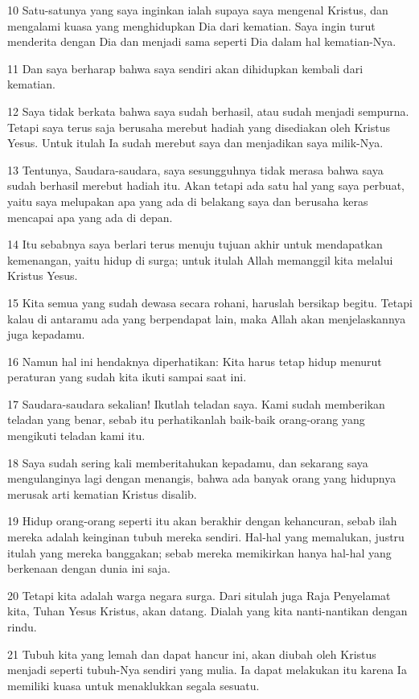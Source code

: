 \par 10 Satu-satunya yang saya inginkan ialah supaya saya mengenal Kristus, dan mengalami kuasa yang menghidupkan Dia dari kematian. Saya ingin turut menderita dengan Dia dan menjadi sama seperti Dia dalam hal kematian-Nya.
\par 11 Dan saya berharap bahwa saya sendiri akan dihidupkan kembali dari kematian.
\par 12 Saya tidak berkata bahwa saya sudah berhasil, atau sudah menjadi sempurna. Tetapi saya terus saja berusaha merebut hadiah yang disediakan oleh Kristus Yesus. Untuk itulah Ia sudah merebut saya dan menjadikan saya milik-Nya.
\par 13 Tentunya, Saudara-saudara, saya sesungguhnya tidak merasa bahwa saya sudah berhasil merebut hadiah itu. Akan tetapi ada satu hal yang saya perbuat, yaitu saya melupakan apa yang ada di belakang saya dan berusaha keras mencapai apa yang ada di depan.
\par 14 Itu sebabnya saya berlari terus menuju tujuan akhir untuk mendapatkan kemenangan, yaitu hidup di surga; untuk itulah Allah memanggil kita melalui Kristus Yesus.
\par 15 Kita semua yang sudah dewasa secara rohani, haruslah bersikap begitu. Tetapi kalau di antaramu ada yang berpendapat lain, maka Allah akan menjelaskannya juga kepadamu.
\par 16 Namun hal ini hendaknya diperhatikan: Kita harus tetap hidup menurut peraturan yang sudah kita ikuti sampai saat ini.
\par 17 Saudara-saudara sekalian! Ikutlah teladan saya. Kami sudah memberikan teladan yang benar, sebab itu perhatikanlah baik-baik orang-orang yang mengikuti teladan kami itu.
\par 18 Saya sudah sering kali memberitahukan kepadamu, dan sekarang saya mengulanginya lagi dengan menangis, bahwa ada banyak orang yang hidupnya merusak arti kematian Kristus disalib.
\par 19 Hidup orang-orang seperti itu akan berakhir dengan kehancuran, sebab ilah mereka adalah keinginan tubuh mereka sendiri. Hal-hal yang memalukan, justru itulah yang mereka banggakan; sebab mereka memikirkan hanya hal-hal yang berkenaan dengan dunia ini saja.
\par 20 Tetapi kita adalah warga negara surga. Dari situlah juga Raja Penyelamat kita, Tuhan Yesus Kristus, akan datang. Dialah yang kita nanti-nantikan dengan rindu.
\par 21 Tubuh kita yang lemah dan dapat hancur ini, akan diubah oleh Kristus menjadi seperti tubuh-Nya sendiri yang mulia. Ia dapat melakukan itu karena Ia memiliki kuasa untuk menaklukkan segala sesuatu.

